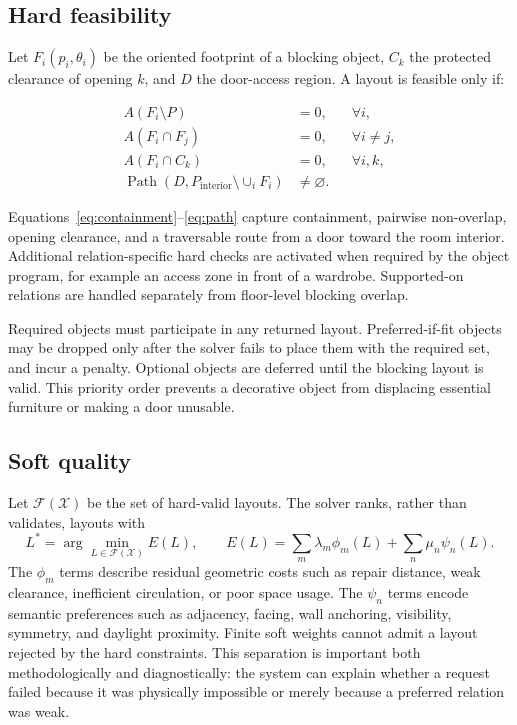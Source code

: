 \documentclass[pdflatex,sn-mathphys-num]{sn-jnl}
\begin{document}
\subsection{Hard feasibility}

Let \(F_i(p_i,\theta_i)\) be the oriented footprint of a blocking object, \(C_k\) the protected clearance of opening \(k\), and \(D\) the door-access region. A layout is feasible only if:

\begin{align}
  A(F_i \setminus P) &= 0, && \forall i, \label{eq:containment}\\
  A(F_i \cap F_j) &= 0, && \forall i\neq j, \label{eq:collision}\\
  A(F_i \cap C_k) &= 0, && \forall i,k, \label{eq:opening}\\
  \operatorname{Path}(D,P_{\mathrm{interior}}\setminus\cup_i F_i) &\neq \varnothing. && \label{eq:path}
\end{align}

Equations~\eqref{eq:containment}--\eqref{eq:path} capture containment, pairwise non-overlap, opening clearance, and a traversable route from a door toward the room interior. Additional relation-specific hard checks are activated when required by the object program, for example an access zone in front of a wardrobe. Supported-on relations are handled separately from floor-level blocking overlap.

Required objects must participate in any returned layout. Preferred-if-fit objects may be dropped only after the solver fails to place them with the required set, and incur a penalty. Optional objects are deferred until the blocking layout is valid. This priority order prevents a decorative object from displacing essential furniture or making a door unusable.

\subsection{Soft quality}

Let \(\mathcal{F}(\mathcal{X})\) be the set of hard-valid layouts. The solver ranks, rather than validates, layouts with
\begin{equation}
  L^{*}=\arg\min_{L\in\mathcal{F}(\mathcal{X})}
  E(L), \qquad
  E(L)=\sum_m\lambda_m\phi_m(L)+\sum_n\mu_n\psi_n(L).
  \label{eq:soft-objective}
\end{equation}
The \(\phi_m\) terms describe residual geometric costs such as repair distance, weak clearance, inefficient circulation, or poor space usage. The \(\psi_n\) terms encode semantic preferences such as adjacency, facing, wall anchoring, visibility, symmetry, and daylight proximity. Finite soft weights cannot admit a layout rejected by the hard constraints. This separation is important both methodologically and diagnostically: the system can explain whether a request failed because it was physically impossible or merely because a preferred relation was weak.
\end{document}
